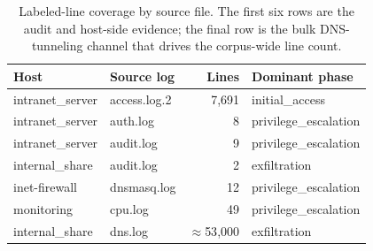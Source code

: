 \begin{table}[htbp]
\caption{Labeled-line coverage by source file. The first six rows are the
audit and host-side evidence; the final row is the bulk DNS-tunneling
channel that drives the corpus-wide line count.}
\label{tab:source-coverage}
\centering
\footnotesize
\setlength{\tabcolsep}{4pt}
\begin{tabular}{llrl}
\toprule
\textbf{Host} & \textbf{Source log} & \textbf{Lines} & \textbf{Dominant phase} \\
\midrule
intranet\_server & access.log.2 & 7{,}691           & initial\_access \\
intranet\_server & auth.log     & 8                 & privilege\_escalation \\
intranet\_server & audit.log    & 9                 & privilege\_escalation \\
internal\_share  & audit.log    & 2                 & exfiltration \\
inet-firewall    & dnsmasq.log  & 12                & privilege\_escalation \\
monitoring       & cpu.log      & 49                & privilege\_escalation \\
\midrule
internal\_share  & dns.log      & $\approx$53{,}000 & exfiltration \\
\bottomrule
\end{tabular}
\end{table}
